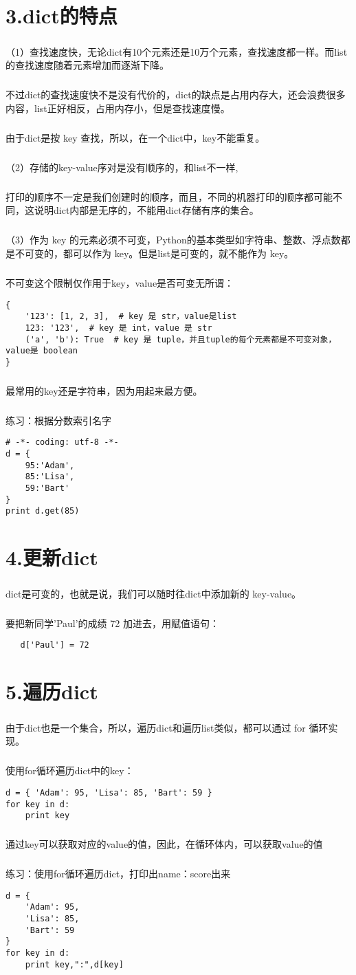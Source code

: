 \documentclass{article}
\begin{document}
\begin{CJK}{UTF8}{gbsn}
\section*{3.dict的特点}
\subparagraph*{}
（1）查找速度快，无论dict有10个元素还是10万个元素，查找速度都一样。而list的查找速度随着元素增加而逐渐下降。
\subparagraph*{}
不过dict的查找速度快不是没有代价的，dict的缺点是占用内存大，还会浪费很多内容，list正好相反，占用内存小，但是查找速度慢。
\subparagraph*{}
由于dict是按 key 查找，所以，在一个dict中，key不能重复。
\subparagraph*{}
（2）存储的key-value序对是没有顺序的，和list不一样,
\subparagraph*{}
打印的顺序不一定是我们创建时的顺序，而且，不同的机器打印的顺序都可能不同，这说明dict内部是无序的，不能用dict存储有序的集合。
\subparagraph*{}
（3）作为 key 的元素必须不可变，Python的基本类型如字符串、整数、浮点数都是不可变的，都可以作为 key。但是list是可变的，就不能作为 key。
\subparagraph*{}
不可变这个限制仅作用于key，value是否可变无所谓：
\begin{verbatim}
{
    '123': [1, 2, 3],  # key 是 str，value是list
    123: '123',  # key 是 int，value 是 str
    ('a', 'b'): True  # key 是 tuple，并且tuple的每个元素都是不可变对象，value是 boolean
}
\end{verbatim}
\subparagraph*{}
最常用的key还是字符串，因为用起来最方便。
\subparagraph*{}
练习：根据分数索引名字
\begin{verbatim}
# -*- coding: utf-8 -*-
d = {
    95:'Adam',
    85:'Lisa',
    59:'Bart'
}
print d.get(85)
\end{verbatim}
\section*{4.更新dict}
\subparagraph*{}
dict是可变的，也就是说，我们可以随时往dict中添加新的 key-value。
\subparagraph*{}
要把新同学'Paul'的成绩 72 加进去，用赋值语句：
\begin{verbatim}
   d['Paul'] = 72
\end{verbatim}
\section*{5.遍历dict}
\subparagraph*{}
由于dict也是一个集合，所以，遍历dict和遍历list类似，都可以通过 for 循环实现。
\subparagraph*{}
使用for循环遍历dict中的key：
\begin{verbatim}
d = { 'Adam': 95, 'Lisa': 85, 'Bart': 59 }
for key in d:
    print key
\end{verbatim}
\subparagraph*{}
通过key可以获取对应的value的值，因此，在循环体内，可以获取value的值
\subparagraph*{}
练习：使用for循环遍历dict，打印出name：score出来
\begin{verbatim}
d = {
    'Adam': 95,
    'Lisa': 85,
    'Bart': 59
}
for key in d:
    print key,":",d[key]
\end{verbatim}

\end{CJK}
\end{document}
